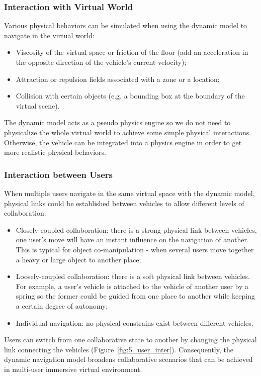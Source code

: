 \subsubsection{Interaction with Virtual World}
Various physical behaviors can be simulated when using the dynamic model to navigate in the virtual world:

\begin{itemize}
\item Viscosity of the virtual space or friction of the floor (add an acceleration in the opposite direction of the vehicle's current velocity);
\item Attraction or repulsion fields associated with a zone or a location;
\item Collision with certain objects (e.g. a bounding box at the boundary of the virtual scene).
\end{itemize}

The dynamic model acts as a pseudo physics engine so we do not need to physicalize the whole virtual world to achieve some simple physical interactions. Otherwise, the vehicle can be integrated into a physics engine in order to get more realistic physical behaviors.

\subsubsection{Interaction between Users}
When multiple users navigate in the same virtual space with the dynamic model, physical links could be established between vehicles to allow different levels of collaboration:     

\begin{itemize}
\item Closely-coupled collaboration: there is a strong physical link between vehicles, one user's move will have an instant influence on the navigation of another. This is typical for object co-manipulation - when several users move together a heavy or large object to another place;
\item Loosely-coupled collaboration: there is a soft physical link between vehicles. For example, a user's vehicle is attached to the vehicle of another user by a spring so the former could be guided from one place to another while keeping a certain degree of autonomy;
\item Individual navigation: no physical constrains exist between different vehicles.
\end{itemize}

Users can switch from one collaborative state to another by changing the physical link connecting the vehicles (Figure~\ref{fig:5_user_inter}). Consequently, the dynamic navigation model broadens collaborative scenarios that can be achieved in multi-user immersive virtual environment.

